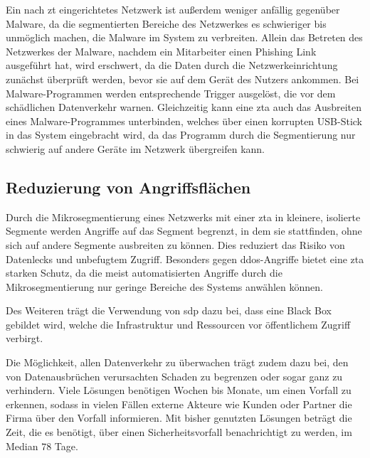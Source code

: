 Ein nach \ac{zt} eingerichtetes Netzwerk ist außerdem weniger anfällig gegenüber Malware, da die segmentierten Bereiche des Netzwerkes es schwieriger bis unmöglich machen, die Malware im System zu verbreiten.
Allein das Betreten des Netzwerkes der Malware, nachdem \zb ein Mitarbeiter einen Phishing Link ausgeführt hat, wird erschwert, da die Daten durch die Netzwerkeinrichtung zunächst überprüft werden, bevor sie auf dem Gerät des Nutzers ankommen.\autocite[\vglf][]{cunningham-2019}
Bei Malware-Programmen werden entsprechende Trigger ausgelöst, die vor dem schädlichen Datenverkehr warnen.\autocite[\vglf][]{cunningham-2019}
Gleichzeitig kann eine \ac{zta} auch das Ausbreiten eines Malware-Programmes unterbinden, welches \zb über einen korrupten USB-Stick in das System eingebracht wird, da das Programm durch die Segmentierung nur schwierig auf andere Geräte im Netzwerk übergreifen kann.\autocite[\vglf][]{cunningham-2019}

\subsection{Reduzierung von Angriffsflächen}\label{subsec:reduzierung-von-angriffsflachen}
Durch die Mikrosegmentierung eines Netzwerks mit einer \ac{zta} in kleinere, isolierte Segmente werden Angriffe auf das Segment begrenzt, in dem sie stattfinden, ohne sich auf andere Segmente ausbreiten zu können.
Dies reduziert das Risiko von Datenlecks und unbefugtem Zugriff.\autocites[\vglf][]{shore-2021}[\vglf][]{buck-2021}
Besonders gegen \ac{ddos}-Angriffe bietet eine \ac{zta} starken Schutz, da die meist automatisierten Angriffe durch die Mikrosegmentierung nur geringe Bereiche des Systems anwählen können.\autocite[\vglf][]{Eidle-2017}

Des Weiteren trägt die Verwendung von \ac{sdp} dazu bei, dass eine Black Box gebildet wird, welche die Infrastruktur und Ressourcen vor öffentlichem Zugriff verbirgt.\autocites[\vglf][]{buck-2021}[\vglf][]{kumar-2019}

Die Möglichkeit, allen Datenverkehr zu überwachen trägt zudem dazu bei, den von Datenausbrüchen verursachten Schaden zu begrenzen oder sogar ganz zu verhindern.\autocite[\vglf][]{cunningham-2019}
Viele Lösungen benötigen Wochen bis Monate, um einen Vorfall zu erkennen, sodass in vielen Fällen externe Akteure wie Kunden oder Partner die Firma über den Vorfall informieren.\autocite[\vglf][]{cunningham-2019}
Mit bisher genutzten Lösungen beträgt die Zeit, die es benötigt, über einen Sicherheitsvorfall benachrichtigt zu werden, im Median $78$ Tage.\autocite[\vglf][]{fireeye-2019}

